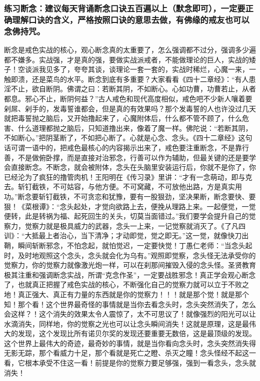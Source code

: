 \subsubsection{练习断念：建议每天背诵断念口诀五百遍以上（默念即可），一定要正确理解口诀的含义，严格按照口诀的意思去做，有佛缘的戒友也可以念佛持咒。}

断念是戒色实战的核心，观心断念真的太重要了，怎么强调都不过分，强调多少遍都不嫌多。实战强，才是真的强，要做实战派戒者，不能做理论的巨人，实战的矮子！空谈派我见多了，夸夸其谈，谈理论一套一套的，实战时稀烂，心魔一来，一触即溃，还是菜鸟的水平。断念到底有多重要？大家看看《四十二章经》：“有人患淫不止，欲自断阴。佛谓之曰：若断其阴，不如断心。心如功曹，功曹若止，从者都息。邪心不止，断阴何益？”古人戒色和现代高度相似，戒色吧不少新人嚷着要剁屌、剁手的，发毒誓谁都会，但是真的有效果吗？那个发毒誓的人也许没过几天就把毒誓抛之脑后，又开始撸起来了，心魔附体后，什么都不管不顾了，什么危害、什么道理都抛之脑后，只知道撸出来，像着了魔一样。佛陀说：“若断其阴，不如断心。”把阴茎断了，不如把心断了。心就是心念、念头。《四十二章经》这句话可谓一语中的，把戒色最核心的内容揭示出来了，戒色要注重断念，不是靠行善，不是做俯卧撑，而是直接对治邪念，行善可以作为辅助，但最关键的还是要学会直接断念。不断念，就会被附体，念头在头脑里安装运行后，你就不是你了，你已经沦为了疯狂的撸管肉机！王阳明在《传习录》里讲：“才有一念萌动，即与克去。斩钉截铁，不可姑容，与他方便。不可窝藏，不可放他出路，方是真实用功。”断念要斩钉截铁，不可贪恋和犹豫，要有一股狠劲，坚决果断，断念要快、要狠！《菜根谭》：“念头起处，才觉向欲路上去，便挽从理路上来。一起便觉，一觉便转，此是转祸为福、起死回生的关头，切莫当面错过。”我们要学会提升自己的觉察力，觉察力就是极具威力的武器，念头一上来，一记觉察就消灭了。《了凡四训》：“大抵最上者治心，当下清净；才动即觉，觉之即无。”这一觉，就像快刀出鞘，瞬间斩断邪念，不怕念起，就怕觉迟，一定要快觉！丁愚仁老师：“当念头起时，及时地观照这个念头，念头就会化为乌有。”观照即觉察，念头怪无法承受你的觉察力，你的觉察力就像激光炮一样，可以在刹那间摧毁入侵的念头怪。圣贤教育极其注重和强调断念实战，所谓“克念作圣”，一定要战胜邪念！真正学会观心断念了，也就真正把握了戒色实战的核心，不断强化自己的觉察力就可以立于不败之地！真正强大、真正有力量的东西就是你的觉察力！！！就是那个觉！就是那个知！那个看！这个世界最奇怪的事情就是当你去看念头时，念头突然消失了，怎么会这样？！这个消失的效果太令人震惊了，太不可思议了！就像强烈的阳光可以让水滴消失，同样地，你的觉察之光也可以让念头瞬间消失！这就是原理，这是最伟大的发现，这个发现比所有诺贝尔奖的发现还要重要无数倍，这是最顶级的发现。这个世界上最伟大的奇迹，最奇妙的事情，就是当你看向念头时，念头突然消失得无影无踪，那个看威力十足，那个看就是死亡之瞪、杀灭之瞳！念头怪经不起这一看，它根本承受不住这一看！前提是你的觉察力要足够强，强到一看念头，念头就消失！

